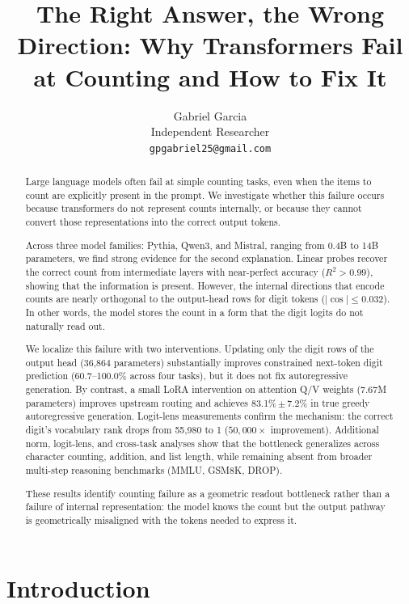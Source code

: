 \documentclass{article}
\title{The Right Answer, the Wrong Direction: Why Transformers Fail at Counting and How to Fix It}
\author{
  Gabriel Garcia \\
  Independent Researcher \\
  \texttt{gpgabriel25@gmail.com}
}
\begin{document}
\maketitle

\begin{abstract}
Large language models often fail at simple counting tasks, even when the items
to count are explicitly present in the prompt. We investigate whether this
failure occurs because transformers do not represent counts internally, or
because they cannot convert those representations into the correct output tokens.

Across three model families: Pythia, Qwen3, and Mistral, ranging from 0.4B to
14B parameters, we find strong evidence for the second explanation. Linear
probes recover the correct count from intermediate layers with near-perfect
accuracy ($R^2>0.99$), showing that the information is present. However, the
internal directions that encode counts are nearly orthogonal to the output-head
rows for digit tokens ($|\cos| \leq 0.032$). In other words, the model stores
the count in a form that the digit logits do not naturally read out.

We localize this failure with two interventions. Updating only the digit rows of
the output head (36,864 parameters) substantially improves constrained next-token
digit prediction (60.7--100.0\% across four tasks), but it does not fix
autoregressive generation. By contrast, a small LoRA intervention on attention
Q/V weights (7.67M parameters) improves upstream routing and achieves
83.1\%\,$\pm$\,7.2\% in true greedy autoregressive generation. Logit-lens
measurements confirm the mechanism: the correct digit's vocabulary rank drops from
55,980 to 1 ($50{,}000\times$ improvement). Additional norm, logit-lens, and
cross-task analyses show that the bottleneck generalizes across character counting,
addition, and list length, while remaining absent from broader multi-step reasoning
benchmarks (MMLU, GSM8K, DROP).

These results identify counting failure as a geometric readout bottleneck rather
than a failure of internal representation: the model knows the count but the
output pathway is geometrically misaligned with the tokens needed to express it.
\end{abstract}

\section{Introduction}
\label{sec:introduction}
\end{document}
